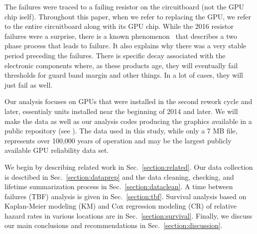 The failures were traced to a failing resistor on the circuitboard
(not the GPU chip iself). Throughout this paper, when we refer to
replacing the GPU, we refer to the entire circuitboard along with its
GPU chip. While the 2016 resistor failures were a surprise, there is a
known phenomenon~\cite{referenceneeded} that describes a two phase
process that leads to failure. It also explains why there was a very
stable period preceding the failures. There is specific decay
associated with the electronic components where, as these products
age, they will eventually fail thresholds for guard band margin and
other things. In a lot of cases, they will just fail as
well. 

Our analysis focuses on GPUs that were installed in the second rework
cycle and later, essentialy units installed near the beginning of 2014
and later. We will make the data as well as our analysis codes
producing the graphics available in a public repository (see
).  The data used in this study, while only a 7 MB
file, represents over 100,000 years of operation and may be the
largest publicly available GPU reliability data set.

We begin by describing related work in Sec.~\ref{section:related}. Our
data collection is desctibed in Sec.~\ref{section:dataprep} and the
data cleaning, checking, and lifetime summarization process in
Sec.~\ref{section:dataclean}. A time between failures (TBF) analysis
is given in Sec.~\ref{section:tbf}. Survival analysis based on
Kaplan-Meier modeling (KM) and Cox regression modeling (CR) of
relative hazard rates in various locations are in
Sec.~\ref{section:survival}. Finally, we discuss our main conclusions
and recommendations in Sec.~\ref{section:discussion}.
 


